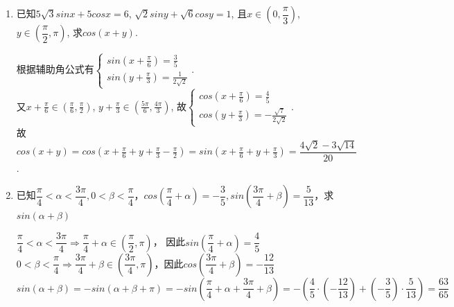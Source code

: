 \begin{enumerate}
   \item 已知$5\sqrt{3}sin{x}+5cos{x}=6$, $\sqrt{2}sin{y}+\sqrt{6}cos{y}=1$, 
    且$x\in\left(0,\dfrac{\pi}{3}\right)$, $y\in\left(\dfrac{\pi}{2},\pi\right)$, 
    求$cos(x+y)$. 
    \begin{jieda}
    根据辅助角公式有$\begin{cases}
    sin(x+\frac{\pi}{6})=\frac{3}{5}\\
    sin(y+\frac{\pi}{3})=\frac{1}{2\sqrt{2}}
    \end{cases}$. \\
    又$x+\frac{\pi}{6}\in(\frac{\pi}{6},\frac{\pi}{2})$, $y+\frac{\pi}{3}\in(\frac{5\pi}{6}, \frac{4\pi}{3})$, 
    故$\begin{cases}
    cos(x+\frac{\pi}{6})=\frac{4}{5}\\
    cos(y+\frac{\pi}{3})=-\frac{\sqrt{7}}{2\sqrt{2}}
    \end{cases}$. \\
    故$cos(x+y)=cos(x+\frac{\pi}{6}+y+\frac{\pi}{3}-\frac{\pi}{2})=sin(x+\frac{\pi}{6}+y+\frac{\pi}{3})=\dfrac{4\sqrt{2}-3\sqrt{14}}{20}$. 
    \end{jieda}

    \item 已知$\dfrac{\pi}{4} < \alpha < \dfrac{3\pi}{4}, 0 < \beta < \dfrac{\pi}{4}$，$cos\left(\dfrac{\pi}{4} + \alpha\right) = -\dfrac{3}{5}, sin\left(\dfrac{3\pi}{4} + \beta\right) = \dfrac{5}{13}$，求$sin\left(\alpha + \beta\right)$
    \begin{jieda}
        $\dfrac{\pi}{4} < \alpha < \dfrac{3\pi}{4} \Rightarrow \dfrac{\pi}{4} + \alpha \in \left(\dfrac{\pi}{2}, \pi \right)$， 因此$sin\left(\dfrac{\pi}{4}+\alpha \right) = \dfrac{4}{5}$ \\
        $ 0 < \beta < \dfrac{\pi}{4} \Rightarrow \dfrac{3\pi}{4} + \beta \in \left(\dfrac{3\pi}{4}, \pi \right)$，因此$cos\left(\dfrac{3\pi}{4} + \beta\right) = -\dfrac{12}{13}$ \\
        $sin\left(\alpha + \beta\right) = -sin\left(\alpha + \beta + \pi\right) = -sin\left(\dfrac{\pi}{4}+\alpha + \dfrac{3\pi}{4} + \beta\right) = -\left(\dfrac{4}{5} \cdot \left(-\dfrac{12}{13}\right) + \left(-\dfrac{3}{5}\right)\cdot\dfrac{5}{13}\right) = \dfrac{63}{65}$
    \end{jieda}


\end{enumerate}
